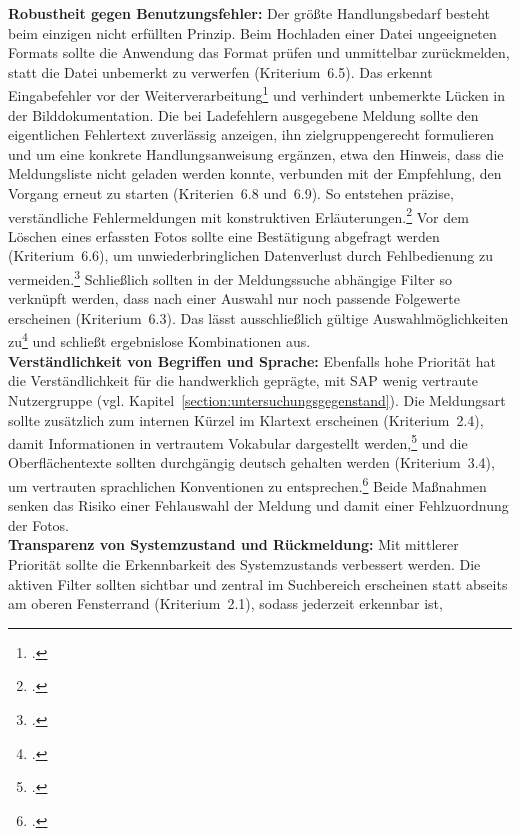 \textbf{Robustheit gegen Benutzungsfehler:}
Der größte Handlungsbedarf besteht beim einzigen nicht erfüllten Prinzip.
Beim Hochladen einer Datei ungeeigneten Formats sollte die Anwendung das Format
prüfen und unmittelbar zurückmelden, statt die Datei unbemerkt zu verwerfen
(Kriterium~6.5).
Das erkennt Eingabefehler vor der
Weiterverarbeitung\footcite[Vgl.][Abschnitt~5.6.2.5]{DIN_ISO_9241-110:2020} und
verhindert unbemerkte Lücken in der Bilddokumentation.
Die bei Ladefehlern ausgegebene Meldung sollte den eigentlichen Fehlertext
zuverlässig anzeigen, ihn zielgruppengerecht formulieren und um eine konkrete
Handlungsanweisung ergänzen, etwa den Hinweis, dass die Meldungsliste nicht
geladen werden konnte, verbunden mit der Empfehlung, den Vorgang erneut zu starten
(Kriterien~6.8 und~6.9).
So entstehen präzise, verständliche Fehlermeldungen mit konstruktiven
Erläuterungen.\footcites[Vgl.][Abschnitt~5.6.4.2]{DIN_ISO_9241-110:2020}[Vgl.][Abschnitt~5.6.4.3]{DIN_ISO_9241-110:2020}
Vor dem Löschen eines erfassten Fotos sollte eine Bestätigung abgefragt werden
(Kriterium~6.6), um unwiederbringlichen Datenverlust durch Fehlbedienung zu
vermeiden.\footcite[Vgl.][Abschnitt~5.6.2.6]{DIN_ISO_9241-110:2020}
Schließlich sollten in der Meldungssuche abhängige Filter so verknüpft werden,
dass nach einer Auswahl nur noch passende Folgewerte erscheinen (Kriterium~6.3).
Das lässt ausschließlich gültige Auswahlmöglichkeiten
zu\footcite[Vgl.][Abschnitt~5.6.2.3]{DIN_ISO_9241-110:2020} und schließt
ergebnislose Kombinationen aus.\\
\textbf{Verständlichkeit von Begriffen und Sprache:}
Ebenfalls hohe Priorität hat die Verständlichkeit für die handwerklich geprägte,
mit SAP wenig vertraute Nutzergruppe
(vgl. Kapitel~\ref{section:untersuchungsgegenstand}).
Die Meldungsart sollte zusätzlich zum internen Kürzel im Klartext erscheinen
(Kriterium~2.4), damit Informationen in vertrautem Vokabular dargestellt
werden,\footcite[Vgl.][Abschnitt~5.2.2.5]{DIN_ISO_9241-110:2020} und die
Oberflächentexte sollten durchgängig deutsch gehalten werden (Kriterium~3.4), um
vertrauten sprachlichen Konventionen zu
entsprechen.\footcite[Vgl.][Abschnitt~5.3.3.1]{DIN_ISO_9241-110:2020}
Beide Maßnahmen senken das Risiko einer Fehlauswahl der Meldung und damit einer
Fehlzuordnung der Fotos.\\
\textbf{Transparenz von Systemzustand und Rückmeldung:}
Mit mittlerer Priorität sollte die Erkennbarkeit des Systemzustands verbessert
werden.
Die aktiven Filter sollten sichtbar und zentral im Suchbereich erscheinen statt
abseits am oberen Fensterrand (Kriterium~2.1), sodass jederzeit erkennbar ist,
